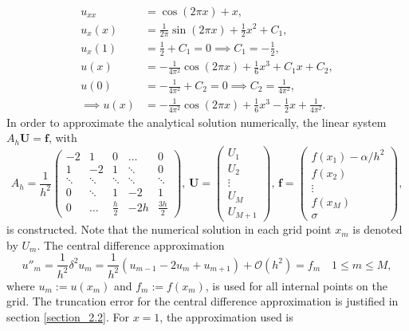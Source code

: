 \begin{equation*}
\begin{split}
    u_{xx} &= \cos{(2\pi x)} + x, \\
    u_x(x) &= \frac{1}{2\pi}\sin{(2\pi x)} + \frac12x^2 + C_1, \\
    u_x(1) &= \frac12 + C_1 = 0 \implies C_1 = -\frac12, \\
    u(x) &= -\frac{1}{4\pi^2}\cos{(2\pi x)} + \frac16x^3 + C_1x + C_2, \\
    u(0) &= -\frac{1}{4\pi^2} + C_2 = 0 \implies C_2 = \frac{1}{4\pi^2}, \\
    \implies u(x) &= -\frac{1}{4\pi^2}\cos{(2\pi x)} + \frac16x^3 -\frac12x + \frac{1}{4\pi^2}.
\end{split}
\end{equation*}
In order to approximate the analytical solution numerically, the linear system $A_h\boldsymbol{U} = \boldsymbol{f}$, with 
\begin{equation*}
    A_h = \frac{1}{h^2}\begin{pmatrix} 
    -2 & 1 & 0 & \dots & 0 \\
    1 & -2 & 1 & \ddots & 0 \\
    \ddots & \ddots & \ddots & \ddots & \ddots \\
    0 & \ddots & 1 & -2 & 1 \\
    0 & \dots & \frac h2 & -2h & \frac{3h}{2}
    \end{pmatrix}, \, 
    \boldsymbol{U} = \begin{pmatrix}
    U_1 \\
    U_2 \\
    \vdots \\
    U_M \\
    U_{M+1}
    \end{pmatrix}, \, \boldsymbol{f} = \begin{pmatrix}
    f(x_1) - \alpha/h^2 \\
    f(x_2) \\
    \vdots \\
    f(x_M) \\
    \sigma
    \end{pmatrix},
\end{equation*}
is constructed. Note that the numerical solution in each grid point $x_m$ is denoted by $U_m$. The central difference approximation
\begin{equation}
    u''_m = \frac{1}{h^2} \delta^2 u_m = \frac{1}{h^2}(u_{m-1} - 2u_m + u_{m+1}) + \mathcal{O}(h^2) = f_m \quad 1 \le m \le M,
    \label{centralDiff1a)}
\end{equation}
where $u_m := u(x_m)$ and $f_m := f(x_m)$, 
is used for all internal points on the grid. The truncation error for the central difference approximation is justified in section \ref{section_2.2}. For $x = 1$, the approximation used is

